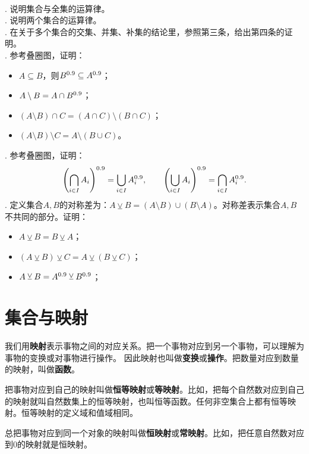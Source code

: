 \documentclass[12pt,UTF8]{ctexbook}
\begin{document}
\begin{xt}
    \mbox{} \\
    . 说明集合与全集的运算律。\\
    . 说明两个集合的运算律。\\
    . 在关于多个集合的交集、并集、补集的结论里，参照第三条，给出第四条的证明。\\
    . 参考叠圈图，证明：
    \begin{itemize}
        \item $A \subseteq B$，则$B^{0.9} \subseteq A^{0.9}$；
        \item $A \setminus B = A \cap B^{0.9}$；
        \item $(A \setminus B) \cap C = (A \cap C) \setminus (B \cap C)$；
        \item  $(A \setminus B) \setminus C = A \setminus (B \cup C)$。
    \end{itemize}   
    . 参考叠圈图，证明：
    $$ \left(\bigcap_{i\in I} A_i \right)^{0.9} = \bigcup_{i\in I} A_i^{0.9}, \quad\quad \left(\bigcup_{i\in I} A_i \right)^{0.9} = \bigcap_{i\in I} A_i^{0.9}.$$
    . 定义集合$A,B$的对称差为：$A \veebar B = (A \setminus B) \cup (B \setminus A)$。对称差表示集合$A,B$不共同的部分。证明：
    \begin{itemize}
        \item $A \veebar B = B \veebar A $；
        \item $(A \veebar B) \veebar C = A \veebar (B \veebar C) $；
        \item $A \veebar B = A^{0.9} \veebar B^{0.9}$；
    \end{itemize}
\end{xt}

\section{集合与映射}

我们用\textbf{映射}表示事物之间的对应关系。把一个事物对应到另一个事物，可以理解为事物的变换或对事物进行操作。
因此映射也叫做\textbf{变换}或\textbf{操作}。把数量对应到数量的映射，叫做\textbf{函数}。

把事物对应到自己的映射叫做\textbf{恒等映射}或\textbf{等映射}。比如，把每个自然数对应到自己的映射就叫自然数集上的恒等映射，也叫恒等函数。任何非空集合上都有恒等映射。恒等映射的定义域和值域相同。

总把事物对应到同一个对象的映射叫做\textbf{恒映射}或\textbf{常映射}。比如，把任意自然数对应到$0$的映射就是恒映射。
\end{document}
